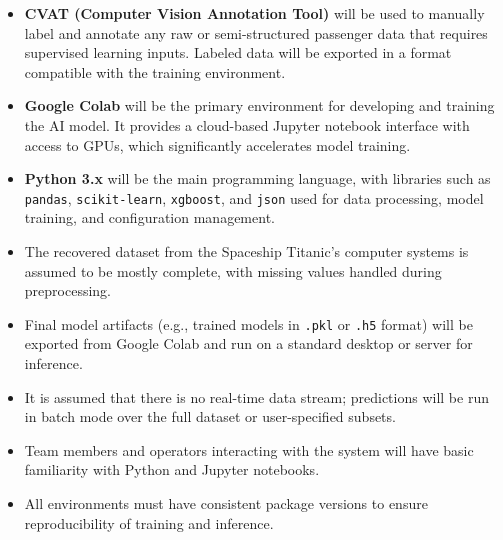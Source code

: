 \documentclass[15pt]{article}
\begin{document}
\begin{itemize}
    \item \textbf{CVAT (Computer Vision Annotation Tool)} will be used to manually label and annotate any raw or semi-structured passenger data that requires supervised learning inputs. Labeled data will be exported in a format compatible with the training environment.
    \item \textbf{Google Colab} will be the primary environment for developing and training the AI model. It provides a cloud-based Jupyter notebook interface with access to GPUs, which significantly accelerates model training.
    \item \textbf{Python 3.x} will be the main programming language, with libraries such as \texttt{pandas}, \texttt{scikit-learn}, \texttt{xgboost}, and \texttt{json} used for data processing, model training, and configuration management.
    \item The recovered dataset from the Spaceship Titanic's computer systems is assumed to be mostly complete, with missing values handled during preprocessing.
    \item Final model artifacts (e.g., trained models in \texttt{.pkl} or \texttt{.h5} format) will be exported from Google Colab and run on a standard desktop or server for inference.
    \item It is assumed that there is no real-time data stream; predictions will be run in batch mode over the full dataset or user-specified subsets.
    \item Team members and operators interacting with the system will have basic familiarity with Python and Jupyter notebooks.
    \item All environments must have consistent package versions to ensure reproducibility of training and inference.
\end{itemize}
\end{document}
